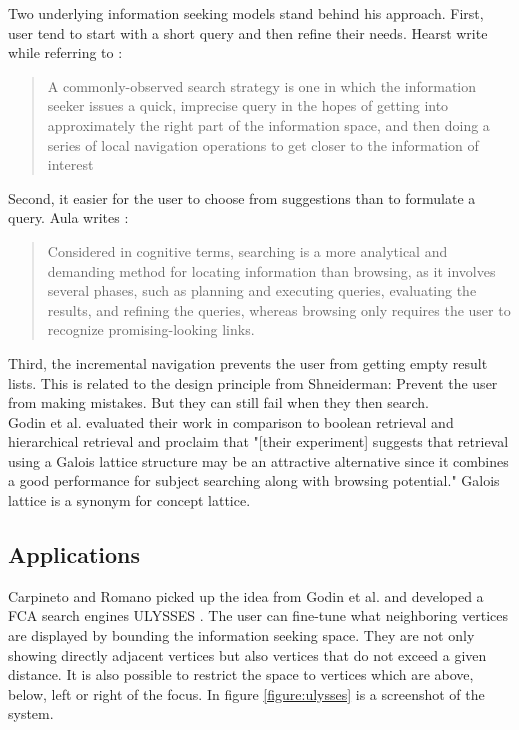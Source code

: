 \documentclass[11pt]{report}
\begin{document}
Two underlying information seeking models stand behind his approach. First, user tend to start with a short query and then refine their needs. Hearst \cite{Hearst2009} write  while referring to \cite{Marchionini2006,Bates1990}:
\begin{quote}
	A commonly-observed search strategy is one in which the information seeker issues a quick, imprecise query in the hopes of getting into approximately the right part of the information space, and then doing a series of local navigation operations to get closer to the information of interest
\end{quote}

Second, it easier for the user to choose from suggestions than to formulate a query. Aula writes \cite{Aula2005}:
\begin{quote}
	Considered in cognitive terms, searching is a more analytical and demanding method for locating information than browsing, as it involves several phases, such as planning and executing queries, evaluating the results, and refining the queries, whereas browsing only requires the user to recognize promising-looking links.
\end{quote}

Third, the incremental navigation prevents the user from getting empty result lists. This is related to the design principle from Shneiderman: Prevent the user from making mistakes. But they can still fail when they then search. \\

Godin et al. \cite{Godin1993} evaluated their work in comparison to boolean retrieval and hierarchical retrieval and proclaim that "[their experiment] suggests that retrieval using a Galois lattice structure may be an attractive alternative since it combines a good performance for subject searching along with browsing potential." Galois lattice is a synonym for concept lattice.\\

\subsection{Applications}

Carpineto and Romano picked up the idea from Godin et al. and developed a FCA search engines ULYSSES \cite{Carpineto1995,Carpineto1996}. The user can fine-tune what neighboring vertices are displayed by bounding the information seeking space. They are not only showing directly adjacent vertices but also vertices that do not exceed a given distance. It is also possible to restrict the space to vertices which are above, below, left or right of the focus. In figure \ref{figure:ulysses} is a screenshot of the system. \\
\end{document}
